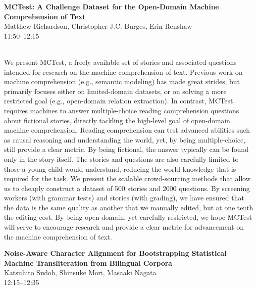 \documentclass[twoside,makeidx]{book}
\begin{document}
\par\vspace{2em}\noindent%
\begin{minipage}{\linewidth}%
\begin{center}
\textbf{\normalsize MCTest: A Challenge Dataset for the Open-Domain Machine Comprehension of Text}\\
\normalsize  Matthew Richardson,  Christopher J.C. Burges,  Erin Renshaw\\
{\small 11:50--12:15}\\
\end{center}
\end{minipage}\\[0.5em]
\nopagebreak%
\noindent%
{\small We present MCTest, a freely available set of stories and associated questions intended for research on the machine comprehension of text. Previous work on machine comprehension (e.g., semantic modeling) has made great strides, but primarily focuses either on limited-domain datasets, or on solving a more restricted goal (e.g., open-domain relation extraction). In contrast, MCTest requires machines to answer multiple-choice reading comprehension questions about fictional stories, directly tackling the high-level goal of open-domain machine comprehension. Reading comprehension can test advanced abilities such as causal reasoning and understanding the world, yet, by being multiple-choice, still provide a clear metric. By being fictional, the answer typically can be found only in the story itself. The stories and questions are also carefully limited to those a young child would understand, reducing the world knowledge that is required for the task. We present the scalable crowd-sourcing methods that allow us to cheaply construct a dataset of 500 stories and 2000 questions. By screening workers (with grammar tests) and stories (with grading), we have ensured that the data is the same quality as another that we manually edited, but at one tenth the editing cost. By being open-domain, yet carefully restricted, we hope MCTest will serve to encourage research and provide a clear metric for advancement on the machine comprehension of text.}
\par\vspace{2em}\noindent%
\begin{minipage}{\linewidth}%
\begin{center}
\textbf{\normalsize Noise-Aware Character Alignment for Bootstrapping Statistical Machine Transliteration from Bilingual Corpora}\\
\normalsize  Katsuhito Sudoh,  Shinsuke Mori,  Masaaki Nagata\\
{\small 12:15--12:35}\\
\end{center}
\end{minipage}\\[0.5em]
\end{document}
